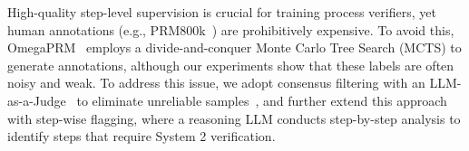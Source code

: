 High-quality step-level supervision is crucial for training process verifiers, yet human annotations (e.g., PRM800k~\cite{Lightman2023LetsVS800k}) are prohibitively expensive. To avoid this, OmegaPRM~\cite{luo2024improve_omegaprm} employs a divide-and-conquer Monte Carlo Tree Search (MCTS) to generate annotations, although our experiments show that these labels are often noisy and weak. To address this issue, we adopt consensus filtering with an LLM-as-a-Judge~\cite{Gu2024ASOJudge} to eliminate unreliable samples~\cite{zhang2025lessons}, and further extend this approach with step-wise flagging, where a reasoning LLM conducts step-by-step analysis to identify steps that require System 2 verification.



